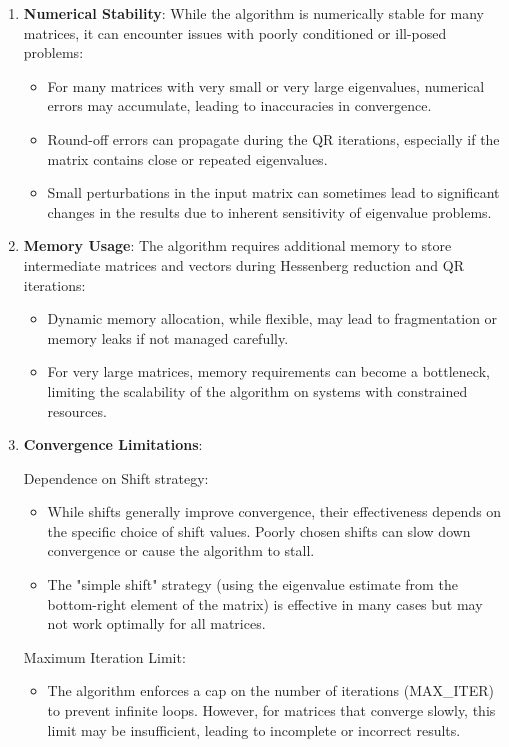 \documentclass[a4paper,11pt,oneside]{report}
\begin{document}
\begin{enumerate}
    \item \textbf{Numerical Stability}: While the algorithm is numerically stable for many matrices, it can encounter issues with poorly conditioned or ill-posed problems:
    \begin{itemize}
        \item For many matrices with very small or very large eigenvalues, numerical errors may accumulate, leading to inaccuracies in convergence.
        \item Round-off errors can propagate during the QR iterations, especially if the matrix contains close or repeated eigenvalues.
        \item Small perturbations in the input matrix can sometimes lead to significant changes in the results due to inherent sensitivity of eigenvalue problems.
    \end{itemize}

    \item \textbf{Memory Usage}: The algorithm requires additional memory to store intermediate matrices and vectors during Hessenberg reduction and QR iterations:
    \begin{itemize}
        \item Dynamic memory allocation, while flexible, may lead to fragmentation or memory leaks if not managed carefully.
        \item For very large matrices, memory requirements can become a bottleneck, limiting the scalability of the algorithm on systems with constrained resources.
    \end{itemize}

    \item \textbf{Convergence Limitations}: 

    Dependence on Shift strategy:
    \begin{itemize}
        \item While shifts generally improve convergence, their effectiveness depends on the specific choice of shift values. Poorly chosen shifts can slow down convergence or cause the algorithm to stall.
        \item The "simple shift" strategy (using the eigenvalue estimate from the bottom-right element of the matrix) is effective in many cases but may not work optimally for all matrices.
    \end{itemize}

    Maximum Iteration Limit:
    \begin{itemize}
        \item The algorithm enforces a cap on the number of iterations (MAX\_ITER) to prevent infinite loops. However, for matrices that converge slowly, this limit may be insufficient, leading to incomplete or incorrect results.
    \end{itemize}
    

\end{enumerate}
\end{document}
